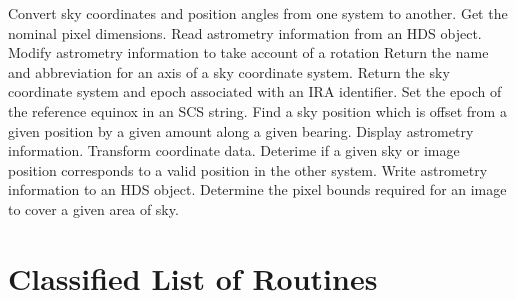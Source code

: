    {Convert sky coordinates and position angles from one system to another.}
   {Get the nominal pixel dimensions.}
   {Read astrometry information from an HDS object.}
   {Modify astrometry information to take account of a rotation}
   {Return the name and abbreviation for an axis of a sky coordinate system.}
   {Return the sky coordinate system and epoch associated with an IRA 
    identifier.}
   {Set the epoch of the reference equinox in an SCS string.}
   {Find a sky position which is offset from a given position by a given
   amount along a given  bearing.}
   {Display astrometry information.}
   {Transform coordinate data.}
   {Deterime if a given sky or image position corresponds to a valid position
    in the other system.}
   {Write astrometry information to an HDS object.}
   {Determine the pixel bounds required for an image to cover a given area of 
    sky.}

\section {Classified List of Routines}

